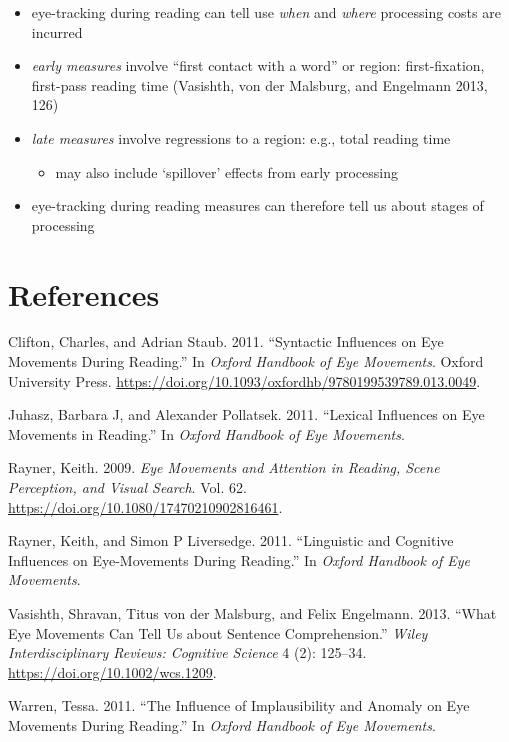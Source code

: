 \documentclass[
  letterpaper,
  DIV=11,
  numbers=noendperiod]{scrartcl}
\providecommand{\tightlist}{%
  \setlength{\itemsep}{0pt}\setlength{\parskip}{0pt}}\usepackage{longtable,booktabs,array}
\newlength{\cslhangindent}
\newlength{\cslentryspacingunit} %
\newenvironment{CSLReferences}[2] %
 {%
  \setlength{\parindent}{0pt}
  \ifodd #1
  \let\oldpar\par
  \def\par{\hangindent=\cslhangindent\oldpar}
  \fi
  \setlength{\parskip}{#2\cslentryspacingunit}
 }%
 {}
\begin{document}
\begin{itemize}
\tightlist
\item
  eye-tracking during reading can tell use \emph{when} and \emph{where}
  processing costs are incurred
\item
  \emph{early measures} involve ``first contact with a word'' or region:
  first-fixation, first-pass reading time (Vasishth, von der Malsburg,
  and Engelmann 2013, 126)
\item
  \emph{late measures} involve regressions to a region: e.g., total
  reading time

  \begin{itemize}
  \tightlist
  \item
    may also include `spillover' effects from early processing
  \end{itemize}
\item
  eye-tracking during reading measures can therefore tell us about
  stages of processing
\end{itemize}

\hypertarget{references}{%
\section*{References}\label{references}}

\hypertarget{refs}{}
\begin{CSLReferences}{1}{0}
\leavevmode{}%
Clifton, Charles, and Adrian Staub. 2011. {``Syntactic Influences on Eye
Movements During Reading.''} In \emph{Oxford Handbook of Eye Movements}.
Oxford University Press.
\url{https://doi.org/10.1093/oxfordhb/9780199539789.013.0049}.

\leavevmode{}%
Juhasz, Barbara J, and Alexander Pollatsek. 2011. {``Lexical Influences
on Eye Movements in Reading.''} In \emph{Oxford Handbook of Eye
Movements}.

\leavevmode{}%
Rayner, Keith. 2009. \emph{Eye Movements and Attention in Reading, Scene
Perception, and Visual Search}. Vol. 62.
\url{https://doi.org/10.1080/17470210902816461}.

\leavevmode{}%
Rayner, Keith, and Simon P Liversedge. 2011. {``Linguistic and Cognitive
Influences on Eye-Movements During Reading.''} In \emph{Oxford Handbook
of Eye Movements}.

\leavevmode{}%
Vasishth, Shravan, Titus von der Malsburg, and Felix Engelmann. 2013.
{``What Eye Movements Can Tell Us about Sentence Comprehension.''}
\emph{Wiley Interdisciplinary Reviews: Cognitive Science} 4 (2):
125--34. \url{https://doi.org/10.1002/wcs.1209}.

\leavevmode{}%
Warren, Tessa. 2011. {``The Influence of Implausibility and Anomaly on
Eye Movements During Reading.''} In \emph{Oxford Handbook of Eye
Movements}.

\end{CSLReferences}
\end{document}
